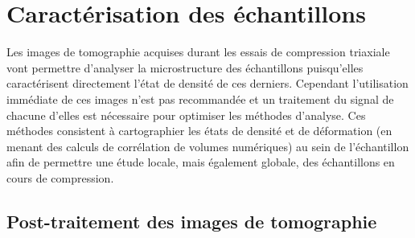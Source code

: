 \section{Caractérisation des échantillons}
	Les images de tomographie acquises durant les essais de compression triaxiale vont permettre d'analyser la microstructure des échantillons puisqu'elles caractérisent directement l'état de densité de ces derniers. Cependant l'utilisation immédiate de ces images n'est pas recommandée et un traitement du signal de chacune d'elles est nécessaire pour optimiser les méthodes d'analyse. Ces méthodes consistent à cartographier les états de densité et de déformation (en menant des calculs de corrélation de volumes numériques) au sein de l'échantillon afin de permettre une étude locale, mais également globale, des échantillons en cours de compression.
	\subsection{Post-traitement des images de tomographie}
